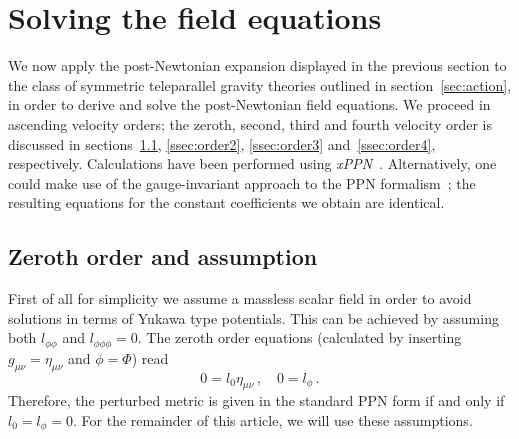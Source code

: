 \documentclass[notitlepage,a4paper,aps,prd,onecolumn,superscriptaddress,nofootinbib,groupedaddress,longbibliography]{revtex4-2}
\begin{document}
\section{Solving the field equations}\label{sec:solution}
We now apply the post-Newtonian expansion displayed in the previous section to the class of symmetric teleparallel gravity theories outlined in section~\ref{sec:action}, in order to derive and solve the post-Newtonian field equations. We proceed in ascending velocity orders; the zeroth, second, third and fourth velocity order is discussed in sections~\ref{ssec:order0}, \ref{ssec:order2}, \ref{ssec:order3} and~\ref{ssec:order4}, respectively. Calculations have been performed using \emph{xPPN}~\cite{Hohmann:2020muq}. Alternatively, one could make use of the gauge-invariant approach to the PPN formalism~\cite{Hohmann:2019qgo,Hohmann:2021zel}; the resulting equations for the constant coefficients we obtain are identical.

\subsection{Zeroth order and assumption}\label{ssec:order0}
First of all for simplicity we assume a massless scalar field in order to avoid solutions in terms of Yukawa type potentials. This can be achieved by assuming both $l_{\phi\phi}$ and $l_{\phi\phi\phi}=0$. The zeroth order equations (calculated by inserting $g_{\mu\nu}=\eta_{\mu\nu}$ and $\phi=\Phi$) read
\begin{equation}
0 = l_0\eta_{\mu\nu}\,, \quad
0 = l_{\phi}\,.
\end{equation}
Therefore, the perturbed metric is given in the standard PPN form if and only if $l_0=l_{\phi}=0$. For the remainder of this article, we will use these assumptions.
\end{document}
